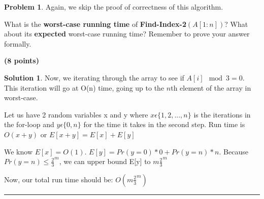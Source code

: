 \documentclass{article}
\theoremstyle{definition}
\newtheorem{problem}{Problem}
\def\fline{\rule{0.75\linewidth}{0.5pt}}
\newcommand{\finishline}{\begin{center}\fline\end{center}}
\newtheorem*{solution*}{Solution}
\newenvironment{solution}{\begin{solution*}}{{\finishline} \end{solution*}}
\newcommand{\grade}[1]{\hfill{\textbf{($\mathbf{#1}$ points)}}}
\begin{document}
\begin{problem}
Again, we skip the proof of correctness of this algorithm. 

\begin{enumerate}
\item[(d)] What is the \textbf{worst-case running time} of \textbf{Find-Index-2$(A[1:n])$}? What about its \textbf{expected} worst-case running time? Remember to prove your answer formally.

\grade{8} 

	\begin{solution}
		\item Now, we iterating through the array to see if $A[i] \mod 3 = 0$. This iteration will go at O(n) time, going up to the $n$th element of the array in worst-case. 
		\item Let us have 2 random variables x and y where $x \epsilon \{1,2,...,n\}$ is the iterations in the for-loop and $y \epsilon \{0, n\}$ for the time it takes in the second step. Run time is $O(x + y)$ or $E[x + y] = E[x] + E[y]$
		\item We know $E[x] = O(1)$. $E[y] = Pr(y = 0) * 0 + Pr(y = n) * n.$ Because $Pr(y = n) \leq {\frac{2}{3}}^m$, we can upper bound E[y] to $m {\frac{2}{3}}^m$
		\item Now, our total run time should be: $O(m {\frac{2}{3}}^m)$ 
	\end{solution}
	
\end{enumerate}

\end{problem}

\smallskip
\end{document}
